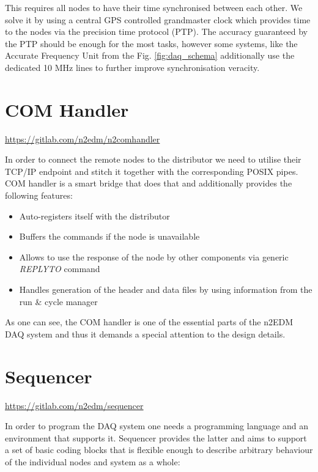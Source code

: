 This requires all nodes to have their time synchronised between each other. We solve it by using a central GPS controlled grandmaster clock which provides time to the nodes via the precision time protocol (PTP). The accuracy guaranteed by the PTP should be enough for the most tasks, however some systems, like the Accurate Frequency Unit from the Fig. \ref{fig:daq_schema} additionally use the dedicated 10 MHz lines to further improve synchronisation veracity.

\section{COM Handler}
\label{sec:com_handler}

\url{https://gitlab.com/n2edm/n2comhandler}

In order to connect the remote nodes to the distributor we need to utilise their TCP/IP endpoint and stitch it together with the corresponding POSIX pipes. COM handler is a smart bridge that does that and additionally provides the following features:

\begin{itemize}
	\item Auto-registers itself with the distributor
	\item Buffers the commands if the node is unavailable
	\item Allows to use the response of the node by other components via generic \textit{REPLYTO} command
	\item Handles generation of the header and data files by using information from the run \& cycle manager
\end{itemize}

As one can see, the COM handler is one of the essential parts of the n2EDM DAQ system and thus it demands a special attention to the design details.

\section{Sequencer}
\label{sec:sequencer}

\url{https://gitlab.com/n2edm/sequencer}

In order to program the DAQ system one needs a programming language and an environment that supports it. Sequencer provides the latter and aims to support a set of basic coding blocks that is flexible enough to describe arbitrary behaviour of the individual nodes and system as a whole:

